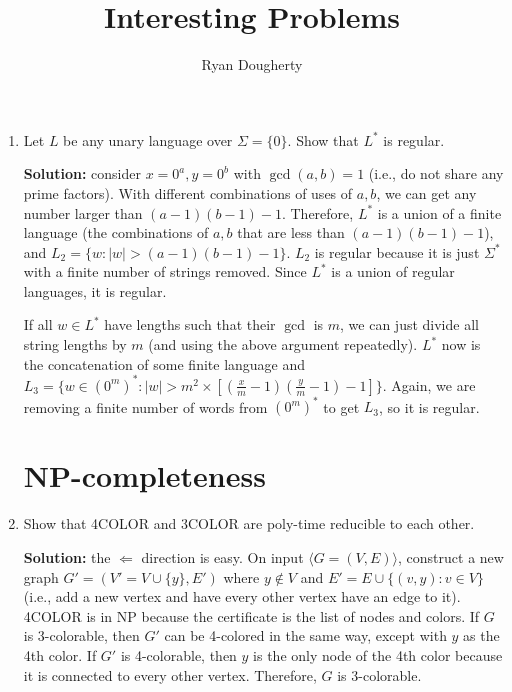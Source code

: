 \documentclass[10pt]{article}
\title{Interesting Problems}
\author{Ryan Dougherty}
\date{}
\begin{document}
\maketitle

\begin{enumerate}
\section{Finite Automata}
\item Let $L$ be any unary language over $\Sigma = \{0\}$. Show that $L^*$ is regular.

\par\textbf{Solution:} consider $x = 0^a, y = 0^b$ with $\gcd(a, b) = 1$ (i.e., do not share any prime factors). With different combinations of uses of $a, b$, we can get any number larger than $(a-1)(b-1) - 1$. Therefore, $L^*$ is a union of a finite language (the combinations of $a, b$ that are less than $(a-1)(b-1)-1$), and $L_2 = \{w \colon |w| > (a-1)(b-1)-1\}$. $L_2$ is regular because it is just $\Sigma^*$ with a finite number of strings removed. Since $L^*$ is a union of regular languages, it is regular. 

\par If all $w \in L^*$ have lengths such that their $\gcd$ is $m$, we can just divide all string lengths by $m$ (and using the above argument repeatedly). $L^*$ now is the concatenation of some finite language and $L_3 = \{w \in (0^m)^* \colon |w| > m^2 \times [(\frac{x}{m}-1)(\frac{y}{m}-1) -1]\}$. Again, we are removing a finite number of words from $(0^m)^*$ to get $L_3$, so it is regular. 

\section{NP-completeness}

\item Show that 4COLOR and 3COLOR are poly-time reducible to each other.

\par\textbf{Solution:} the $\Leftarrow$ direction is easy. On input $\langle G = (V, E) \rangle$, construct a new graph $G' = (V' = V \cup \{y\}, E')$ where $y \notin V$ and $E' = E \cup \{(v, y) \colon v \in V\}$ (i.e., add a new vertex and have every other vertex have an edge to it). 4COLOR is in NP because the certificate is the list of nodes and colors. If $G$ is 3-colorable, then $G'$ can be 4-colored in the same way, except with $y$ as the 4th color. If $G'$ is 4-colorable, then $y$ is the only node of the 4th color because it is connected to every other vertex. Therefore, $G$ is 3-colorable.


\end{enumerate}
\end{document}
